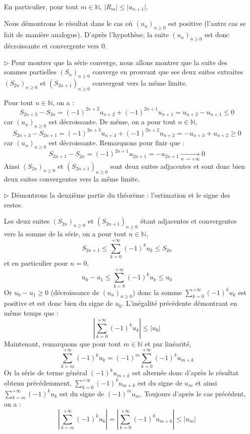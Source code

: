 \documentclass[french,11pt,twoside]{VcCours}
\newcommand{\Sum}[2]{\ensuremath{\textstyle{\sum\limits_{#1}^{#2}}}}
\begin{document}
\begin{Remarque}{} En particulier, pour tout $m \in \mathbb{N}$, $\vert R_m \vert \leq \vert u_{n+1} \vert$.
\end{Remarque}

\begin{Demonstration}{} Nous démontrons le résultat dans le cas où $(u_n)_{n \geq 0}$ est positive (l'autre cas se fait de manière analogue). D'après l'hypothèse, la suite $(u_n)_{n \geq 0}$ est donc décroissante et convergente vers $0$.

\medskip

$\rhd$ Pour montrer que la série converge, nous allons montrer que la suite des sommes partielles $(S_n)_{n \geq 0}$ converge en prouvant que ses deux suites extraites $(S_{2n})_{n \geq 0}$ et $(S_{2n+1})_{n \geq 0}$ convergent vers la même limite. 

Pour tout $n \in \mathbb{N}$, on a :
$$ S_{2n+2} - S_{2n} = (-1)^{2n+2} u_{n+2} + (-1)^{2n+1} u_{n+1} = u_{n+2} - u_{n+1} \leq 0$$ 
car $(u_n)_{n \geq 0}$ est décroissante. De même, on a pour tout $n \in \mathbb{N}$,
$$ S_{2n+3} - S_{2n+1} = (-1)^{2n+3} u_{n+3} + (-1)^{2n+2} u_{n+2} = -u_{n+3} + u_{n+2} \geq  0$$ 
car $(u_n)_{n \geq 0}$ est décroissante. Remarquons pour finir que :
$$ S_{2n+1} - S_{2n} = (-1)^{2n+1}u_{2n+1} = - u_{2n+1} \underset{n \rightarrow + \infty}{\longrightarrow} 0$$
Ainsi $(S_{2n})_{n \geq 0}$ et $(S_{2n+1})_{n \geq 0}$ sont deux suites adjacentes et sont donc bien deux suites convergentes vers la même limite.


\medskip

$\rhd$ Démontrons la deuxième partie du théorème : l'estimation et le signe des restes. 

Les deux suites $(S_{2n})_{n \geq 0}$ et $(S_{2n+1})_{n \geq 0}$ étant adjacentes et convergentes vers la somme de la série, on a pour tout $n \in \mathbb{N}$,
$$ S_{2n+1} \leq \sum_{k=0}^{+ \infty} (-1)^k u_k \leq S_{2n}$$
et en particulier pour $n =0$,
$$ u_0 - u_1 \leq \sum_{k=0}^{+ \infty} (-1)^k u_k \leq u_0 $$
Or $u_0 - u_1 \geq 0$ (décroissance de $(u_n)_{n \geq 0}$) donc la somme $\Sum{k=0}{+ \infty} (-1)^k u_k$ est positive et est donc bien du signe de $u_0$. L'inégalité précédente démontrant en même temps que :
$$ \left\vert \sum_{k=0}^{+ \infty} (-1)^k u_k \right\vert \leq \vert u_0 \vert $$
Maintenant, remarquons que pour tout $m \in \mathbb{N}$ et par linéarité, 
$$\sum_{k=m}^{+ \infty} (-1)^k u_k = (-1)^m \sum_{k=0}^{+ \infty} (-1)^k u_{m+k}$$
Or la série de terme général $(-1)^k u_{m+k}$ est alternée donc d'après le résultat obtenu précédemment, $\Sum{k=0}{+ \infty} (-1)^k u_{m+k}$ est du signe de $u_{m}$ et ainsi $\Sum{k=m}{+ \infty} (-1)^k u_k$ est du signe de $(-1)^m u_m$. Toujours d'après le cas précédent, on a :
$$   \left\vert \sum_{k=m}^{+ \infty} (-1)^k u_k \right\vert = \left\vert \sum_{k=0}^{+ \infty} (-1)^k u_{m+k} \right\vert \leq \vert u_m \vert$$
\end{Demonstration}
\end{document}
